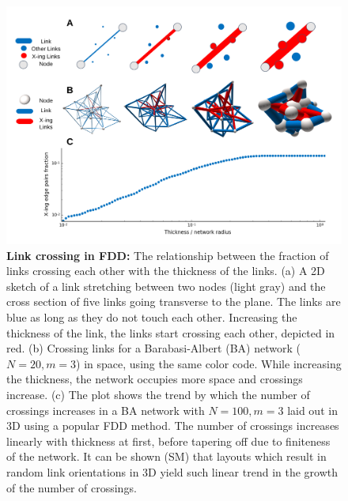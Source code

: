 \documentclass[nofootinbib,preprint,endfloats]{revtex4} %
\begin{document}
\begin{figure}
    \centering
    \includegraphics[width=1\columnwidth]{fig-09-19/panel-crs-2.png}
    \caption{{\bf Link crossing in FDD:} The relationship between the fraction of links crossing each other with the thickness of the links. (a) A 2D sketch of a link stretching between two nodes (light gray) and the cross section of five links going transverse to the plane. The links are blue as long as they do not touch each other. Increasing the thickness of the link, the links start crossing each other, depicted in red. (b)  Crossing links for a Barabasi-Albert (BA) network ($N = 20, m = 3$) in space, using the same color code. While increasing the thickness, the network occupies more space and crossings increase. (c) The plot shows the trend by which the number of crossings increases in a BA network with $N=100, m =3$ laid out in 3D using a popular FDD method. The number of crossings increases linearly with thickness at first, before tapering off due to finiteness of the network. It can be shown (SM) that layouts which result in random link orientations in 3D yield such linear trend in the growth of the number of crossings. }
    \label{fig:crossings}
\end{figure}
\end{document}
